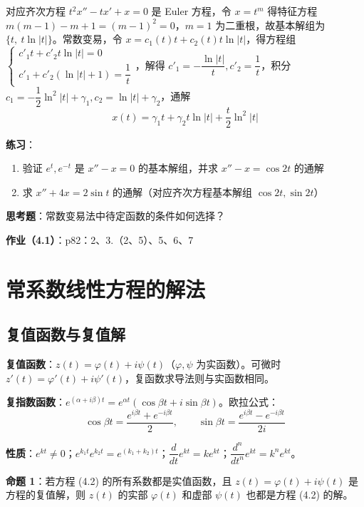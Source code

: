 \begin{solution}
对应齐次方程 $t^2x'' - tx' + x = 0$ 是 Euler 方程，令 $x = t^m$ 得特征方程 $m(m-1) - m + 1 = (m-1)^2 = 0$，$m = 1$ 为二重根，故基本解组为 $\{t,\ t\ln|t|\}$。常数变易，令 $x = c_1(t)t + c_2(t)t\ln|t|$，得方程组 $\begin{cases} c'_1t + c'_2t\ln|t| = 0 \\ c'_1 + c'_2(\ln|t| + 1) = \dfrac{1}{t} \end{cases}$，解得 $c'_1 = -\dfrac{\ln|t|}{t}, c'_2 = \dfrac{1}{t}$，积分 $c_1 = -\dfrac{1}{2}\ln^2|t| + \gamma_1, c_2 = \ln|t| + \gamma_2$，通解
$$x(t) = \gamma_1 t + \gamma_2 t\ln|t| + \frac{t}{2}\ln^2|t|$$
\end{solution}

\textbf{练习}：
\begin{enumerate}
    \item 验证 $e^t, e^{-t}$ 是 $x'' - x = 0$ 的基本解组，并求 $x'' - x = \cos 2t$ 的通解
    \item 求 $x'' + 4x = 2\sin t$ 的通解（对应齐次方程基本解组 $\cos 2t, \sin 2t$）
\end{enumerate}

\textbf{思考题}：常数变易法中待定函数的条件如何选择？

\textbf{作业（4.1）}：p82：2、3.（2、5）、5、6、7

\section{常系数线性方程的解法}

\subsection{复值函数与复值解}

\textbf{复值函数}：$z(t) = \varphi(t) + i\psi(t)$（$\varphi, \psi$ 为实函数）。可微时 $z'(t) = \varphi'(t) + i\psi'(t)$，复函数求导法则与实函数相同。

\textbf{复指数函数}：$e^{(\alpha + i\beta)t} = e^{\alpha t}(\cos\beta t + i\sin\beta t)$。欧拉公式：
$$\cos\beta t = \frac{e^{i\beta t} + e^{-i\beta t}}{2}, \qquad \sin\beta t = \frac{e^{i\beta t} - e^{-i\beta t}}{2i}$$

\textbf{性质}：$e^{kt} \neq 0$；$e^{k_1t}e^{k_2t} = e^{(k_1+k_2)t}$；$\dfrac{d}{dt}e^{kt} = ke^{kt}$；$\dfrac{d^n}{dt^n}e^{kt} = k^n e^{kt}$。

\textbf{命题 1}：若方程 (4.2) 的所有系数都是实值函数，且 $z(t) = \varphi(t) + i\psi(t)$ 是方程的复值解，则 $z(t)$ 的实部 $\varphi(t)$ 和虚部 $\psi(t)$ 也都是方程 (4.2) 的解。

